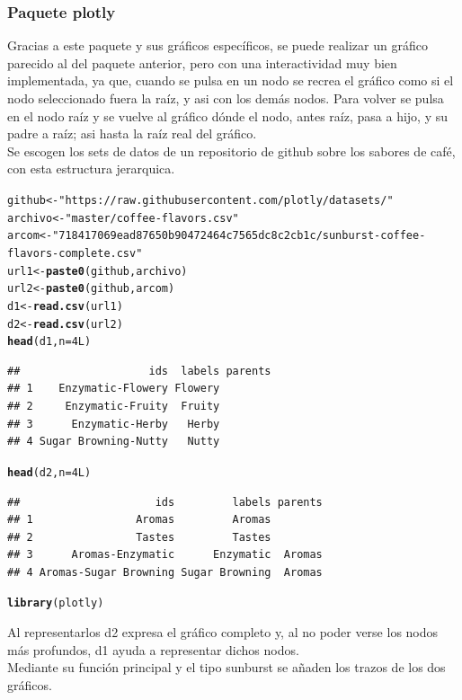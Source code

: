 \documentclass{article}\usepackage[]{graphicx}\usepackage[]{color}
\makeatletter
\newcommand{\hlnum}[1]{\textcolor[rgb]{0.686,0.059,0.569}{#1}}%
\newcommand{\hlstr}[1]{\textcolor[rgb]{0.192,0.494,0.8}{#1}}%
\newcommand{\hlstd}[1]{\textcolor[rgb]{0.345,0.345,0.345}{#1}}%
\newcommand{\hlkwb}[1]{\textcolor[rgb]{0.69,0.353,0.396}{#1}}%
\newcommand{\hlkwc}[1]{\textcolor[rgb]{0.333,0.667,0.333}{#1}}%
\newcommand{\hlkwd}[1]{\textcolor[rgb]{0.737,0.353,0.396}{\textbf{#1}}}%
\newenvironment{kframe}{%
 \def\at@end@of@kframe{}%
 \ifinner\ifhmode%
  \def\at@end@of@kframe{\end{minipage}}%
  \begin{minipage}{\columnwidth}%
 \fi\fi%
 \def\FrameCommand##1{\hskip\@totalleftmargin \hskip-\fboxsep
 \colorbox{shadecolor}{##1}\hskip-\fboxsep
     \hskip-\linewidth \hskip-\@totalleftmargin \hskip\columnwidth}%
 \MakeFramed {\advance\hsize-\width
   \@totalleftmargin\z@ \linewidth\hsize
   \@setminipage}}%
 {\par\unskip\endMakeFramed%
 \at@end@of@kframe}
\newenvironment{knitrout}{}{} %
\makeatother
\begin{document}
\subsubsection{Paquete plotly}
Gracias a este paquete %
y sus gr\'aficos espec\'ificos, se puede realizar un gr\'afico parecido al del paquete anterior, pero con una interactividad muy bien implementada, ya que, cuando se pulsa en un nodo se recrea el gr\'afico como si el nodo seleccionado fuera la ra\'iz, y asi con los dem\'as nodos. Para volver se pulsa en el nodo ra\'iz y se vuelve al gr\'afico d\'onde el nodo, antes ra\'iz, pasa a hijo, y su padre a ra\'iz; asi hasta la ra\'iz real del gr\'afico.~\\
Se escogen los sets de datos de un repositorio de github sobre los sabores de caf\'e, con esta estructura jerarquica.
\begin{knitrout}
\color{fgcolor}\begin{kframe}
\begin{alltt}
\hlstd{github} \hlkwb{<-} \hlstr{"https://raw.githubusercontent.com/plotly/datasets/"}
\hlstd{archivo} \hlkwb{<-} \hlstr{"master/coffee-flavors.csv"}
\hlstd{arcom} \hlkwb{<-} \hlstr{"718417069ead87650b90472464c7565dc8c2cb1c/sunburst-coffee-flavors-complete.csv"}
\hlstd{url1} \hlkwb{<-} \hlkwd{paste0}\hlstd{(github, archivo)}
\hlstd{url2} \hlkwb{<-} \hlkwd{paste0}\hlstd{(github, arcom)}
\hlstd{d1} \hlkwb{<-} \hlkwd{read.csv}\hlstd{(url1)}
\hlstd{d2} \hlkwb{<-} \hlkwd{read.csv}\hlstd{(url2)}
\hlkwd{head}\hlstd{(d1,} \hlkwc{n}\hlstd{=}\hlnum{4L}\hlstd{)}
\end{alltt}
\begin{verbatim}
##                    ids  labels parents
## 1    Enzymatic-Flowery Flowery        
## 2     Enzymatic-Fruity  Fruity        
## 3      Enzymatic-Herby   Herby        
## 4 Sugar Browning-Nutty   Nutty
\end{verbatim}
\begin{alltt}
\hlkwd{head}\hlstd{(d2,} \hlkwc{n}\hlstd{=}\hlnum{4L}\hlstd{)}
\end{alltt}
\begin{verbatim}
##                     ids         labels parents
## 1                Aromas         Aromas        
## 2                Tastes         Tastes        
## 3      Aromas-Enzymatic      Enzymatic  Aromas
## 4 Aromas-Sugar Browning Sugar Browning  Aromas
\end{verbatim}
\begin{alltt}
\hlkwd{library}\hlstd{(plotly)}
\end{alltt}
\end{kframe}
\end{knitrout}
Al representarlos d2 expresa el gr\'afico completo y, al no poder verse los nodos m\'as profundos, d1 ayuda a representar dichos nodos.~\\ Mediante su funci\'on principal y el tipo sunburst se a\~naden los trazos de los dos gr\'aficos.
\end{document}
